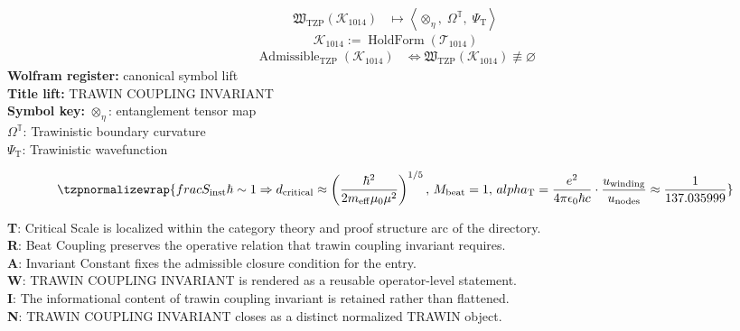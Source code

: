 \noindent
\begin{minipage}[t]{0.48\linewidth}
\begingroup
\small
\[
\begin{aligned}
\mathfrak{W}_{\mathrm{TZP}}\!\left(\mathcal{K}_{1014}\right)
&\longmapsto
\left\langle \otimes_{\eta},\; \Omega^{\mathbb{T}},\; \Psi_{\mathrm{T}} \right\rangle
\end{aligned}
\]
\[
\mathcal{K}_{1014}
:=
\operatorname{HoldForm}\!\left(\mathcal{T}_{1014}\right)
\]
\[
\begin{aligned}
\operatorname{Admissible}_{\mathrm{TZP}}\!\left(\mathcal{K}_{1014}\right)
&\Longleftrightarrow
\mathfrak{W}_{\mathrm{TZP}}\!\left(\mathcal{K}_{1014}\right)\not\equiv\varnothing
\end{aligned}
\]
\textbf{Wolfram register:} canonical symbol lift\\
\textbf{Title lift:} TRAWIN COUPLING INVARIANT\\
\textbf{Symbol key:} \(\otimes_{\eta}\): entanglement tensor map\\ \(\Omega^{\mathbb{T}}\): Trawinistic boundary curvature\\ \(\Psi_{\mathrm{T}}\): Trawinistic wavefunction
\par
\endgroup
\end{minipage}\hfill
\begin{minipage}[t]{0.48\linewidth}
\[
\tzpnormalizewrap{frac{S_{\mathrm{inst}}}{\hbar}\sim 1 \Rightarrow d_{\mathrm{critical}}\approx \left(\frac{\hbar^{2}}{2m_{\mathrm{eff}}\mu_{0}\mu^{2}}\right)^{1/5},\,M_{\mathrm{beat}}=1,\,alpha_{\mathrm{T}}=\frac{e^{2}}{4\pi\epsilon_{0}\hbar c}\cdot \frac{ u_{\mathrm{winding}}}{ u_{\mathrm{nodes}}}\approx \frac{1}{137.035999}}
\]

\small
\textbf{T}: Critical Scale is localized within the category theory and proof structure arc of the directory.\\
\textbf{R}: Beat Coupling preserves the operative relation that trawin coupling invariant requires.\\
\textbf{A}: Invariant Constant fixes the admissible closure condition for the entry.\\
\textbf{W}: TRAWIN COUPLING INVARIANT is rendered as a reusable operator-level statement.\\
\textbf{I}: The informational content of trawin coupling invariant is retained rather than flattened.\\
\textbf{N}: TRAWIN COUPLING INVARIANT closes as a distinct normalized TRAWIN object.
\normalsize
\end{minipage}

